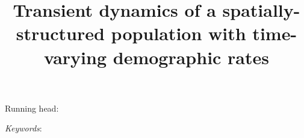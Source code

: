 \documentclass[11pt]{article}
\title{Transient dynamics of a spatially-structured population with time-varying demographic rates}
\begin{document}
\raggedright
\setlength\parindent{0.25in}

\maketitle


% 
% 



\bigskip

Running head: {}

\linenumbers{}

\clearpage








\bigskip

\textit{Keywords}: {}





















\renewcommand{\thefigure}{A\arabic{figure}}
\renewcommand{\theequation}{A\arabic{equation}}
\renewcommand{\thetable}{A\arabic{table}}
\setcounter{equation}{0}
\setcounter{figure}{0}
\setcounter{table}{0}




\clearpage


\end{document}
